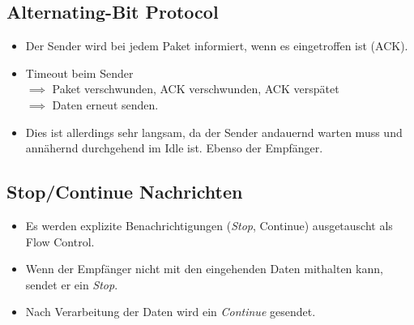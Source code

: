 		\subsection{Alternating-Bit Protocol}
			\label{sec:abp}

			\begin{itemize}
				\item Der Sender wird bei jedem Paket informiert, wenn es eingetroffen ist (ACK).
				\item Timeout beim Sender \\ \(\implies\) Paket verschwunden, ACK verschwunden, ACK verspätet \\ \(\implies\) Daten erneut senden.
				\item Dies ist allerdings sehr langsam, da der Sender andauernd warten muss und annähernd durchgehend im Idle ist. Ebenso der Empfänger.
			\end{itemize}

		\subsection{Stop/Continue Nachrichten}
			\begin{itemize}
				\item Es werden explizite Benachrichtigungen (\textit{Stop}, Continue) ausgetauscht als Flow Control.
				\item Wenn der Empfänger nicht mit den eingehenden Daten mithalten kann, sendet er ein \textit{Stop}.
				\item Nach Verarbeitung der Daten wird ein \textit{Continue} gesendet.
			\end{itemize}

